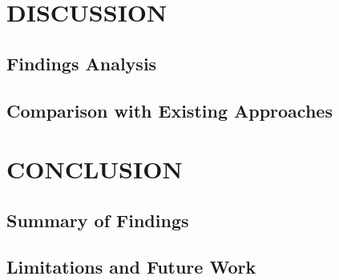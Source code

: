 \documentclass{SOICTthesis}  %
\begin{document}
\chapter{DISCUSSION}
\section{Findings Analysis}
\lipsum[34-36]

\section{Comparison with Existing Approaches}
\lipsum[37-39]
\cite{b12}

\chapter{CONCLUSION}
\section{Summary of Findings}
\lipsum[40-42]

\section{Limitations and Future Work}
\lipsum[43-45]




%
\end{document}
